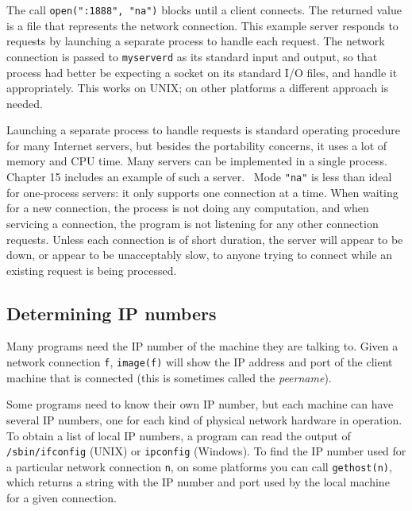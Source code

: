 
The call \texttt{open(":1888",
"na")} blocks until a client connects.
The returned value is a file that represents the network connection.
This example server
responds to requests by launching a separate process to handle each
request. The network connection is passed to \texttt{myserverd} as its
standard input and output, so that process had better be expecting a
socket on its standard I/O files, and handle it appropriately.
This works on UNIX; on other platforms a different approach is needed.

Launching a separate process to handle requests is standard operating
procedure for many Internet servers, but besides the portability
concerns, it uses a lot of memory and CPU time. Many servers can be
implemented in a single process. Chapter 15 includes an example of such
a server. \ Mode \texttt{"na"} is less than
ideal for one-process servers: it only supports one connection at a
time. When waiting for a new connection, the process is not doing any
computation, and when servicing a connection, the program is not
listening for any other connection requests. Unless each connection is
of short duration, the server will appear to be down, or appear to be
unacceptably slow, to anyone trying to connect while an existing
request is being processed.

\subsection{Determining IP numbers}

Many programs need the IP number of the machine they are talking to. Given a
network connection {\texttt f}, \texttt{image(f)} will show the
IP address and port of the client machine that is connected (this is sometimes
called the \textit{peername}).

Some programs need to know their own IP number, but each machine can have
several IP numbers, one for each kind of physical network hardware in operation.
To obtain a list of local IP numbers, a program can read the output of
\texttt{/sbin/ifconfig} (UNIX) or \texttt{ipconfig} (Windows). To find the IP
number used for a particular network connection \texttt{n}, on some platforms
you can call \texttt{gethost(n)}, which returns a string with the IP number and
port used by the local machine for a given connection.

